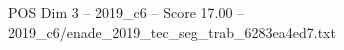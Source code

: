 \begin{textsample}{POS Dim 3 – 2019\_c6 – Score 17.00 – 2019\_c6/enade\_2019\_tec\_seg\_trab\_6283ea4ed7.txt}
\end{textsample}
